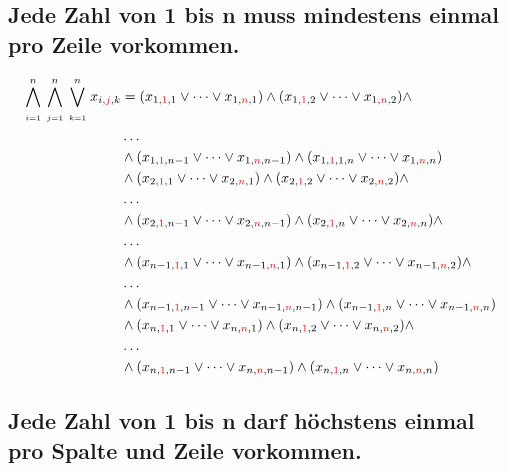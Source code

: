 \documentclass[11pt, a4paper]{article}
\begin{document}
	\subsection{Jede Zahl von 1 bis n muss mindestens einmal pro Zeile vorkommen.}
	\begin{align*}
		\bigwedge_{\atop i=1}^n \bigwedge_{\atop j=1}^n \bigvee_{\atop k=1}^n
		x_{i,{\color{red} j},k} &= (x_{1,{\color{red}1},1} \vee \dots \vee x_{1,{\color{red} n},1}) \wedge (x_{1,{\color{red} 1},2} \vee \dots \vee x_{1,{\color{red} n},2}) \wedge 
		\\ & \dots \\
		& \wedge (x_{1,{\color{red}1},n-1} \vee \dots \vee x_{1,{\color{red} n},n-1}) \wedge (x_{1,{\color{red} 1},1,n} \vee \dots \vee x_{1,{\color{red} n},n}) \\
		& \wedge (x_{2,{\color{red}1},1} \vee \dots \vee x_{2,{\color{red} n},1}) \wedge (x_{2,{\color{red} 1},2} \vee \dots \vee x_{2,{\color{red} n},2}) \wedge 
		\\ & \dots \\
		& \wedge (x_{2,{\color{red}1},n-1} \vee \dots \vee x_{2,{\color{red} n},n-1})
		\wedge (x_{2,{\color{red} 1},n} \vee \dots \vee x_{2,{\color{red} n},n}) \wedge 
		\\ & \dots \\
		& \wedge (x_{n-1,{\color{red}1},1} \vee \dots \vee x_{n-1,{\color{red} n},1}) \wedge (x_{n-1,{\color{red} 1},2} \vee \dots \vee x_{n-1,{\color{red} n},2}) \wedge 
		\\ & \dots \\
		& \wedge (x_{n-1,{\color{red}1},n-1} \vee \dots \vee x_{n-1,{\color{red} n},n-1}) \wedge (x_{n-1,{\color{red} 1},n} \vee \dots \vee x_{n-1,{\color{red} n},n}) \\
		& \wedge (x_{n,{\color{red}1},1} \vee \dots \vee x_{n,{\color{red} n},1}) \wedge (x_{n,{\color{red} 1},2} \vee \dots \vee x_{n,{\color{red} n},2}) \wedge 
		\\ & \dots \\
		& \wedge (x_{n,{\color{red}1},n-1} \vee \dots \vee x_{n,{\color{red} n},n-1}) \wedge (x_{n,{\color{red} 1},n} \vee \dots \vee x_{n,{\color{red} n},n})
	\end{align*}
	\bigskip
		
	\subsection{Jede Zahl von 1 bis n darf höchstens einmal pro Spalte und Zeile vorkommen.}
	
\end{document}
